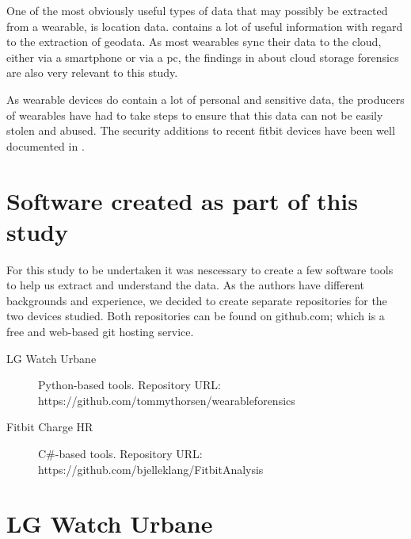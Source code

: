 \documentclass[a4paper,11pt,dvips]{article}
\begin{document}
One of the most obviously useful types of data that may possibly be extracted from a wearable, is location data. \cite{maus2011forensic} contains a lot of useful information with regard to the extraction of geodata. As most wearables sync their data to the cloud, either via a smartphone or via a pc, the findings in \cite{chung2012digital} about cloud storage forensics are also very relevant to this study.

As wearable devices do contain a lot of personal and sensitive data, the producers of wearables have had to take steps to ensure that this data can not be easily stolen and abused. The security additions to recent fitbit devices have been well documented in \cite{cyr2014security}.


\section{Software created as part of this study}
For this study to be undertaken it was nescessary to create a few software tools to help us extract and understand the data. As the authors have different backgrounds and experience, we decided to create separate repositories for the two devices studied. Both repositories can be found on github.com; which is a free and web-based git hosting service.

\begin{description}
\item [LG Watch Urbane] Python-based tools. Repository URL:
\newline
https://github.com/tommythorsen/wearableforensics
\item [Fitbit Charge HR] C\#-based tools. Repository URL:
\newline
https://github.com/bjelleklang/FitbitAnalysis	
\end{description}


\section{LG Watch Urbane}
\end{document}
